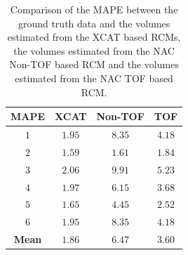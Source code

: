             \begin{table}
                \centering
                
                \captionsetup{singlelinecheck=false}
                \caption{
                    Comparison of the \gls{MAPE} between the ground truth data and the volumes estimated from the \gls{XCAT} based \glspl{RCM}, the volumes estimated from the \gls{NAC} \gls{Non-TOF} based \gls{RCM} and the volumes estimated from the \gls{NAC} \gls{TOF} based \gls{RCM}.
                }
                
                \resizebox*{1.0\linewidth}{!}
                {
                    \begin{tabular}{||c|ccc||}
                        \hline
                        \textbf{\gls{MAPE}} & \textbf{XCAT}     & \textbf{\gls{Non-TOF}}    & \textbf{\gls{TOF}} \\
                        \hline
                        \textbf{$1$}        & $1.95$            & $8.35$                        & $4.18$ \\
                        \textbf{$2$}        & $1.59$            & $1.61$                        & $1.84$ \\
                        \textbf{$3$}        & $2.06$            & $9.91$                        & $5.23$ \\
                        \textbf{$4$}        & $1.97$            & $6.15$                        & $3.68$ \\
                        \textbf{$5$}        & $1.65$            & $4.45$                        & $2.52$ \\
                        \textbf{$6$}        & $1.95$            & $8.35$                        & $4.18$ \\
                        \hline
                        \textbf{Mean}       & $1.86$            & $6.47$                        & $3.60$ \\
                        \hline
                    \end{tabular}
                } \label{tab:impact_of_tof_on_respiratory_motion_model_estimation_using_pre_gated_no_intra_cycle_motion_nAC_pet_results_mape}
            \end{table}
            
